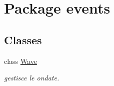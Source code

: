 \hypertarget{namespaceevents}{}\section{Package events}
\label{namespaceevents}
\subsection*{Classes}
\begin{DoxyCompactItemize}
\item 
class \hyperlink{classevents_1_1_wave}{Wave}
\begin{DoxyCompactList}\small\item\em gestisce le ondate. \end{DoxyCompactList}\end{DoxyCompactItemize}
